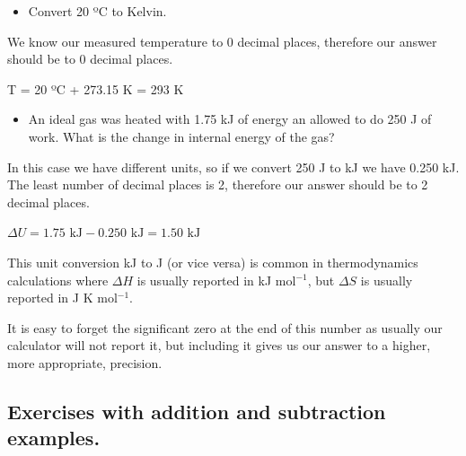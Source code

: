 \documentclass[
  letterpaper,
  DIV=11,
  numbers=noendperiod]{scrreprt}
\providecommand{\tightlist}{%
  \setlength{\itemsep}{0pt}\setlength{\parskip}{0pt}}
\begin{document}
\begin{tcolorbox}[enhanced jigsaw, arc=.35mm, bottomrule=.15mm, bottomtitle=1mm, breakable, colback=white, colbacktitle=quarto-callout-caution-color!10!white, colframe=quarto-callout-caution-color-frame, coltitle=black, left=2mm, leftrule=.75mm, opacityback=0, opacitybacktitle=0.6, rightrule=.15mm, title=\textcolor{quarto-callout-caution-color}{\faFire}\hspace{0.5em}{Examples of significant figures in addition and subtraction.}, titlerule=0mm, toprule=.15mm, toptitle=1mm]

\begin{itemize}
\tightlist
\item
  Convert 20 ºC to Kelvin.
\end{itemize}

We know our measured temperature to 0 decimal places, therefore our
answer should be to 0 decimal places.

T = 20 ºC + 273.15 K = 293 K

\begin{itemize}
\tightlist
\item
  An ideal gas was heated with 1.75 kJ of energy an allowed to do 250 J
  of work. What is the change in internal energy of the gas?
\end{itemize}

In this case we have different units, so if we convert 250 J to kJ we
have 0.250 kJ. The least number of decimal places is 2, therefore our
answer should be to 2 decimal places.

\(\Delta U = 1.75 \textrm{ kJ} - 0.250 \textrm{ kJ} = 1.50 \textrm{ kJ}\)

This unit conversion kJ to J (or vice versa) is common in thermodynamics
calculations where \(\Delta H\) is usually reported in kJ mol\(^{-1}\),
but \(\Delta S\) is usually reported in J K mol\(^{-1}\).

It is easy to forget the significant zero at the end of this number as
usually our calculator will not report it, but including it gives us our
answer to a higher, more appropriate, precision.

\end{tcolorbox}

\subsection{Exercises with addition and subtraction
examples.}\label{exercises-with-addition-and-subtraction-examples.}
\end{document}
